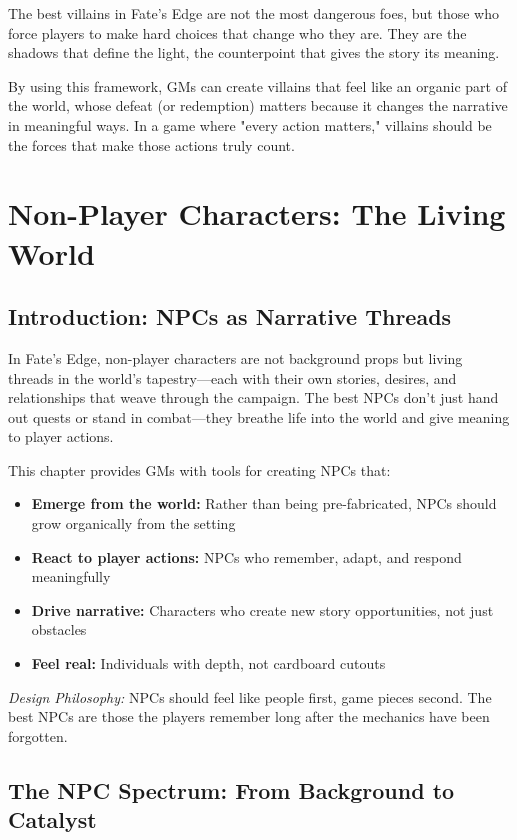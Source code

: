 The best villains in Fate's Edge are not the most dangerous foes, but those who force players to make hard choices that change who they are. They are the shadows that define the light, the counterpoint that gives the story its meaning.

By using this framework, GMs can create villains that feel like an organic part of the world, whose defeat (or redemption) matters because it changes the narrative in meaningful ways. In a game where "every action matters," villains should be the forces that make those actions truly count.

\newpage
\section{Non-Player Characters: The Living World}

\subsection{Introduction: NPCs as Narrative Threads}

In Fate's Edge, non-player characters are not background props but living threads in the world's tapestry---each with their own stories, desires, and relationships that weave through the campaign. The best NPCs don't just hand out quests or stand in combat---they breathe life into the world and give meaning to player actions.

This chapter provides GMs with tools for creating NPCs that:
\begin{itemize}
  \item \textbf{Emerge from the world:} Rather than being pre-fabricated, NPCs should grow organically from the setting
  \item \textbf{React to player actions:} NPCs who remember, adapt, and respond meaningfully
  \item \textbf{Drive narrative:} Characters who create new story opportunities, not just obstacles
  \item \textbf{Feel real:} Individuals with depth, not cardboard cutouts
\end{itemize}

\noindent\textit{Design Philosophy:} NPCs should feel like people first, game pieces second. The best NPCs are those the players remember long after the mechanics have been forgotten.

\subsection{The NPC Spectrum: From Background to Catalyst}

